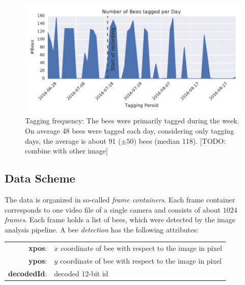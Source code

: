 \begin{figure}[htb]
	\centering
	\includegraphics[width=1.0\textwidth]{Figures/tagging_period}
	\caption[Tagging frequency]{Tagging frequency: The bees were primarily tagged during the week. On average 48 bees were tagged each day, considering only tagging days, the average is about 91 ($\pm50$) bees (median 118). [TODO: combine with other image]}
	\label{fig:tagging}
\end{figure}




\clearpage
\subsection{Data Scheme}
\label{subsec:datascheme}
The data is organized in so-called \emph{frame containers}.
Each frame container corresponds to one video file of a single camera and consists of about $1024$ \emph{frames}.
Each frame holds a list of bees, which were detected by the image analysis pipeline.
A bee \emph{detection} has the following attributes:

\begin{table}[!h]
\centering
\begin{tabular}{rl}
\textbf{xpos}: & $x$ coordinate of bee with respect to the image in pixel \\
\textbf{ypos}: & $y$ coordinate of bee with respect to the image in pixel \\
\textbf{decodedId}: & decoded 12-bit id \\
\end{tabular}
\end{table}

